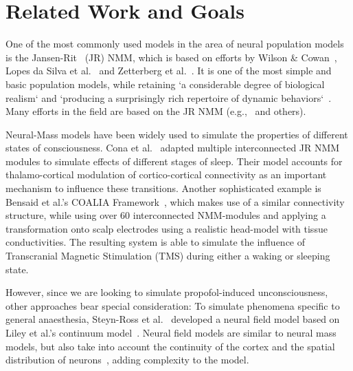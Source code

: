 \section{Related Work and Goals}\label{sec:related-work-and-goals}
One of the most commonly used models in the area of neural population models is the
Jansen-Rit~\cite{jansen_electroencephalogram_1995} (JR) NMM,
which is based on efforts by Wilson \& Cowan~\cite{wilson_excitatory_1972},
Lopes da Silva et al.~\cite{lopes_da_silva_model_1974, lopes_da_silva_models_1976} and
Zetterberg et al.~\cite{zetterberg_performance_1978}.
It is one of the most simple and basic population models,
while retaining `a considerable degree of biological realism` and
`producing a surprisingly rich repertoire of dynamic behaviors`~\cite{knösche_jansen-rit_2014, spiegler_bifurcation_2010}.
Many efforts in the field are based on the JR NMM (e.g.,~\cite{wendling_relevance_2000, david_neural_2003,
    moran_dynamic_2009, cona_thalamo-cortical_2014, bensaid_coalia_2019} and others).

Neural-Mass models have been widely used to simulate the properties of different states of
consciousness.
Cona et al.~\cite{cona_thalamo-cortical_2014} adapted multiple interconnected JR NMM modules to simulate effects
of different stages of sleep.
Their model accounts for thalamo-cortical modulation of cortico-cortical connectivity as an important mechanism to
influence these transitions.
Another sophisticated example is Bensaid et al.'s COALIA Framework~\cite{wendling_epileptic_2002, bensaid_coalia_2019},
which makes use of a similar connectivity structure, while using over 60 interconnected NMM-modules and applying a
transformation onto scalp electrodes using a realistic head-model with tissue conductivities.
The resulting system is able to simulate the influence of Transcranial Magnetic Stimulation (TMS) during either
a waking or sleeping state.

However, since we are looking to simulate propofol-induced unconsciousness, other approaches bear special
consideration:
To simulate phenomena specific to general anaesthesia,
Steyn-Ross et al.~\cite{steyn_ross_modelling_2004, hutt_progress_2011} developed a neural field model based
on Liley et al.'s continuum model~\cite{liley_continuum_1999}.
Neural field models are similar to neural mass models,
but also take into account the continuity of the cortex and the spatial distribution of
neurons~\cite{glomb_computational_2022}, adding complexity to the model.

